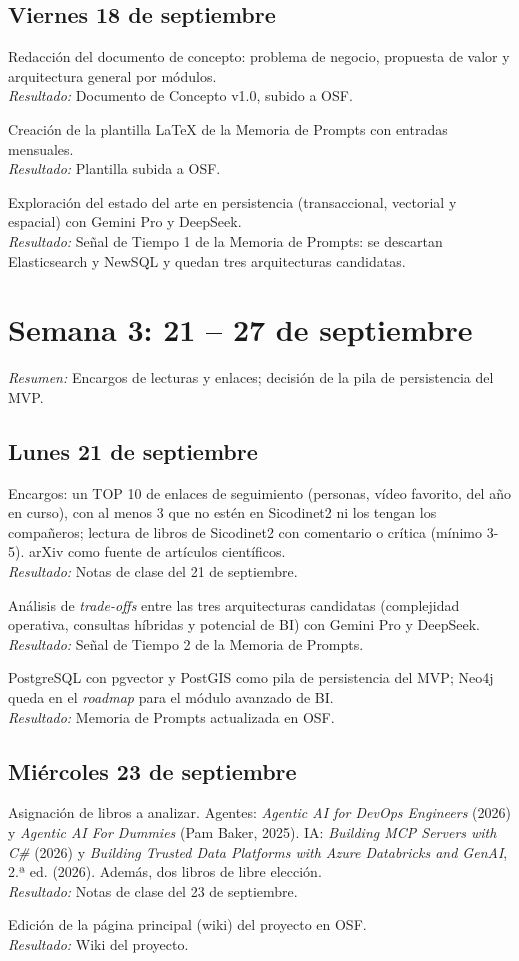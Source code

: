 \documentclass[11pt,a4paper]{article}
\newcommand{\actividad}[3]{\item[\textbf{[#1]}] #2 \\ \textit{Resultado:} #3}
\begin{document}
	\subsection*{Viernes 18 de septiembre}
	\begin{description}[leftmargin=0pt, itemsep=6pt]
		\actividad{Documentación}{Redacción del documento de concepto: problema de negocio, propuesta de valor y arquitectura general por módulos.}{Documento de Concepto v1.0, subido a OSF.}
		\actividad{Documentación}{Creación de la plantilla LaTeX de la Memoria de Prompts con entradas mensuales.}{Plantilla subida a OSF.}
		\actividad{Investigación}{Exploración del estado del arte en persistencia (transaccional, vectorial y espacial) con Gemini Pro y DeepSeek.}{Señal de Tiempo 1 de la Memoria de Prompts: se descartan Elasticsearch y NewSQL y quedan tres arquitecturas candidatas.}
	\end{description}

	\section*{Semana 3: 21 -- 27 de septiembre}
	\textit{Resumen:} Encargos de lecturas y enlaces; decisión de la pila de persistencia del MVP.
	
	\subsection*{Lunes 21 de septiembre}
	\begin{description}[leftmargin=0pt, itemsep=6pt]
		\actividad{Clase}{Encargos: un TOP 10 de enlaces de seguimiento (personas, vídeo favorito, del año en curso), con al menos 3 que no estén en Sicodinet2 ni los tengan los compañeros; lectura de libros de Sicodinet2 con comentario o crítica (mínimo 3-5). arXiv como fuente de artículos científicos.}{Notas de clase del 21 de septiembre.}
		\actividad{Investigación}{Análisis de \textit{trade-offs} entre las tres arquitecturas candidatas (complejidad operativa, consultas híbridas y potencial de BI) con Gemini Pro y DeepSeek.}{Señal de Tiempo 2 de la Memoria de Prompts.}
		\actividad{Decisión}{PostgreSQL con pgvector y PostGIS como pila de persistencia del MVP; Neo4j queda en el \textit{roadmap} para el módulo avanzado de BI.}{Memoria de Prompts actualizada en OSF.}
	\end{description}

	\subsection*{Miércoles 23 de septiembre}
	\begin{description}[leftmargin=0pt, itemsep=6pt]
		\actividad{Clase}{Asignación de libros a analizar. Agentes: \textit{Agentic AI for DevOps Engineers} (2026) y \textit{Agentic AI For Dummies} (Pam Baker, 2025). IA: \textit{Building MCP Servers with C\#} (2026) y \textit{Building Trusted Data Platforms with Azure Databricks and GenAI}, 2.ª ed. (2026). Además, dos libros de libre elección.}{Notas de clase del 23 de septiembre.}
		\actividad{Tarea}{Edición de la página principal (wiki) del proyecto en OSF.}{Wiki del proyecto.}
	\end{description}
\end{document}

